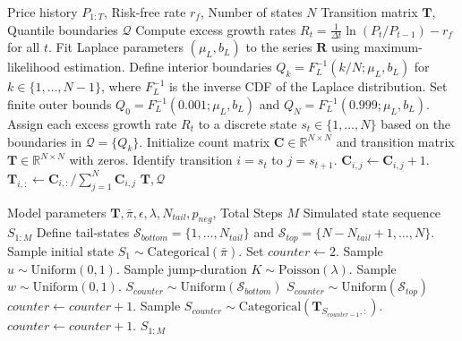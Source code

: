 \documentclass[12pt, letterpaper]{article}
\begin{document}
\begin{algorithm}[htpb]
\caption{Empirical hidden Markov model construction via Laplace partitioning}
\label{alg:build}
\begin{algorithmic}[1]
\REQUIRE Price history $P_{1:T}$, Risk-free rate $r_f$, Number of states $N$
\ENSURE Transition matrix $\mathbf{T}$, Quantile boundaries $\mathcal{Q}$
\STATE Compute excess growth rates $R_t = \frac{1}{\Delta t} \ln(P_t / P_{t-1}) - r_f$ for all $t$.
\STATE Fit Laplace parameters $(\mu_L, b_L)$ to the series $\mathbf{R}$ using maximum-likelihood estimation.
\STATE Define interior boundaries $Q_k = F_L^{-1}(k/N; \mu_L, b_L)$ for $k \in \{1, \dots, N-1\}$, where $F_L^{-1}$ is the inverse CDF of the Laplace distribution.
\STATE Set finite outer bounds $Q_0 = F_L^{-1}(0.001; \mu_L, b_L)$ and $Q_N = F_L^{-1}(0.999; \mu_L, b_L)$.
\STATE Assign each excess growth rate $R_t$ to a discrete state $s_t \in \{1, \dots, N\}$ based on the boundaries in $\mathcal{Q} = \{Q_k\}$.
\STATE Initialize count matrix $\mathbf{C} \in \mathbb{R}^{N \times N}$ and transition matrix $\mathbf{T} \in \mathbb{R}^{N \times N}$ with zeros.
    \STATE Identify transition $i = s_t$ to $j = s_{t+1}$.
\STATE $\mathbf{C}_{i,j} \leftarrow \mathbf{C}_{i,j} + 1$.
\ENDFOR
{}
    \STATE $\mathbf{T}_{i,:} \leftarrow \mathbf{C}_{i,:} / \sum_{j=1}^{N} \mathbf{C}_{i,j}$ 
\ENDFOR
\RETURN $\mathbf{T}, \mathcal{Q}$
\end{algorithmic}
\end{algorithm}

\clearpage

\begin{algorithm}[htpb]
\caption{Hybrid jump-diffusion simulation with persistent volatility}
\label{alg:sim}
\begin{algorithmic}[1]
\REQUIRE Model parameters $\mathbf{T}, \bar{\pi}, \epsilon, \lambda, N_{tail}, p_{neg}$, Total Steps $M$
\ENSURE Simulated state sequence $S_{1:M}$
\STATE Define tail-states $\mathcal{S}_{bottom} = \{1, \dots, N_{tail}\}$ and $\mathcal{S}_{top} = \{N-N_{tail}+1, \dots, N\}$.
\STATE Sample initial state $S_1 \sim \text{Categorical}(\bar{\pi})$.
\STATE Set $counter \leftarrow 2$.
    \STATE Sample $u \sim \text{Uniform}(0, 1)$.
        \STATE Sample jump-duration $K \sim \text{Poisson}(\lambda)$.
            \STATE Sample $w \sim \text{Uniform}(0, 1)$.
                \STATE $S_{counter} \sim \text{Uniform}(\mathcal{S}_{bottom})$ 
            \ELSE
                \STATE $S_{counter} \sim \text{Uniform}(\mathcal{S}_{top})$ 
            \ENDIF
            \STATE $counter \leftarrow counter + 1$.
        \ENDFOR
    \ELSE
        \STATE Sample $S_{counter} \sim \text{Categorical}(\mathbf{T}_{S_{counter-1}, :})$.
        \STATE $counter \leftarrow counter + 1$.
    \ENDIF
\ENDWHILE
\RETURN $S_{1:M}$
\end{algorithmic}
\end{algorithm}
\end{document}
